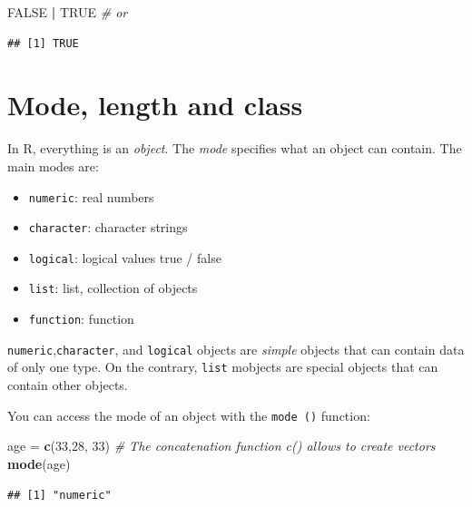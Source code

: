 \documentclass[]{book}
\newenvironment{Shaded}{\begin{snugshade}}{\end{snugshade}}
\newcommand{\CommentTok}[1]{\textcolor[rgb]{0.56,0.35,0.01}{\textit{#1}}}
\newcommand{\DecValTok}[1]{\textcolor[rgb]{0.00,0.00,0.81}{#1}}
\newcommand{\KeywordTok}[1]{\textcolor[rgb]{0.13,0.29,0.53}{\textbf{#1}}}
\newcommand{\NormalTok}[1]{#1}
\newcommand{\OperatorTok}[1]{\textcolor[rgb]{0.81,0.36,0.00}{\textbf{#1}}}
\newcommand{\OtherTok}[1]{\textcolor[rgb]{0.56,0.35,0.01}{#1}}
\newcommand{\StringTok}[1]{\textcolor[rgb]{0.31,0.60,0.02}{#1}}
\providecommand{\tightlist}{%
  \setlength{\itemsep}{0pt}\setlength{\parskip}{0pt}}
\begin{document}
\begin{Shaded}
\begin{Highlighting}[]
\OtherTok{FALSE} \OperatorTok{|}\StringTok{ }\OtherTok{TRUE} \CommentTok{# or}
\end{Highlighting}
\end{Shaded}

\begin{verbatim}
## [1] TRUE
\end{verbatim}

\hypertarget{mode-length-and-class}{%
\section{Mode, length and class}\label{mode-length-and-class}}

In R, everything is an \emph{object}. The \emph{mode} specifies what an object can contain. The main modes are:

\begin{itemize}
\tightlist
\item
  \texttt{numeric}: real numbers
\item
  \texttt{character}: character strings
\item
  \texttt{logical}: logical values true / false
\item
  \texttt{list}: list, collection of objects
\item
  \texttt{function}: function
\end{itemize}

\texttt{numeric},\texttt{character}, and \texttt{logical} objects are \emph{simple} objects that can contain data of only one type. On the contrary, \texttt{list} mobjects are special objects that can contain other objects.

You can access the mode of an object with the \texttt{mode\ ()} function:

\begin{Shaded}
\begin{Highlighting}[]
\NormalTok{age =}\StringTok{ }\KeywordTok{c}\NormalTok{(}\DecValTok{33}\NormalTok{,}\DecValTok{28}\NormalTok{, }\DecValTok{33}\NormalTok{) }\CommentTok{# The concatenation function c() allows to create vectors}
\KeywordTok{mode}\NormalTok{(age)}
\end{Highlighting}
\end{Shaded}

\begin{verbatim}
## [1] "numeric"
\end{verbatim}
\end{document}
